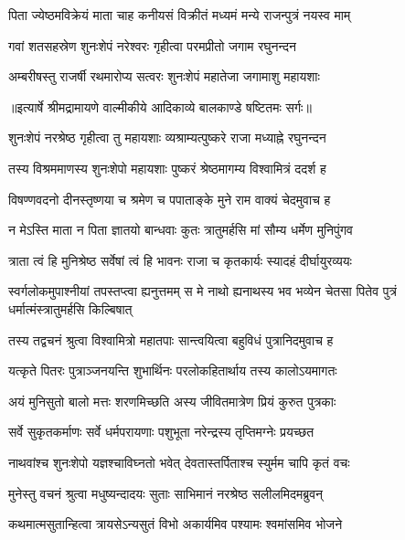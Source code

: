 \twolineshloka
{पिता ज्येष्ठमविक्रेयं माता चाह कनीयसं}
{विक्रीतं मध्यमं मन्ये राजन्पुत्रं नयस्व माम्} %

\twolineshloka
{गवां शतसहस्रेण शुनःशेपं नरेश्वरः}
{गृहीत्वा परमप्रीतो जगाम रघुनन्दन} %

\twolineshloka
{अम्बरीषस्तु राजर्षी रथमारोप्य सत्वरः}
{शुनःशेपं महातेजा जगामाशु महायशाः} %


{॥इत्यार्षे श्रीमद्रामायणे वाल्मीकीये आदिकाव्ये बालकाण्डे षष्टितमः सर्गः॥}


\twolineshloka
{शुनःशेपं नरश्रेष्ठ गृहीत्वा तु महायशाः}
{व्यश्राम्यत्पुष्करे राजा मध्याह्ने रघुनन्दन} %

\twolineshloka
{तस्य विश्रममाणस्य शुनःशेपो महायशाः}
{पुष्करं श्रेष्ठमागम्य विश्वामित्रं ददर्श ह} %

\twolineshloka
{विषण्णवदनो दीनस्तृष्णया च श्रमेण च}
{पपाताङ्के मुने राम वाक्यं चेदमुवाच ह} %

\twolineshloka
{न मेऽस्ति माता न पिता ज्ञातयो बान्धवाः कुतः}
{त्रातुमर्हसि मां सौम्य धर्मेण मुनिपुंगव} %

\twolineshloka
{त्राता त्वं हि मुनिश्रेष्ठ सर्वेषां त्वं हि भावनः}
{राजा च कृतकार्यः स्यादहं दीर्घायुरव्ययः} %

\threelineshloka
{स्वर्गलोकमुपाश्नीयां तपस्तप्त्वा ह्यनुत्तमम्}
{स मे नाथो ह्यनाथस्य भव भव्येन चेतसा}
{पितेव पुत्रं धर्मात्मंस्त्रातुमर्हसि किल्बिषात्} %

\twolineshloka
{तस्य तद्वचनं श्रुत्वा विश्वामित्रो महातपाः}
{सान्त्वयित्वा बहुविधं पुत्रानिदमुवाच ह} %

\twolineshloka
{यत्कृते पितरः पुत्राञ्जनयन्ति शुभार्थिनः}
{परलोकहितार्थाय तस्य कालोऽयमागतः} %

\twolineshloka
{अयं मुनिसुतो बालो मत्तः शरणमिच्छति}
{अस्य जीवितमात्रेण प्रियं कुरुत पुत्रकाः} %

\twolineshloka
{सर्वे सुकृतकर्माणः सर्वे धर्मपरायणाः}
{पशुभूता नरेन्द्रस्य तृप्तिमग्नेः प्रयच्छत} %

\twolineshloka
{नाथवांश्च शुनःशेपो यज्ञश्चाविघ्नतो भवेत्}
{देवतास्तर्पिताश्च स्युर्मम चापि कृतं वचः} %

\twolineshloka
{मुनेस्तु वचनं श्रुत्वा मधुष्यन्दादयः सुताः}
{साभिमानं नरश्रेष्ठ सलीलमिदमब्रुवन्} %

\twolineshloka
{कथमात्मसुतान्हित्वा त्रायसेऽन्यसुतं विभो}
{अकार्यमिव पश्यामः श्वमांसमिव भोजने} %

